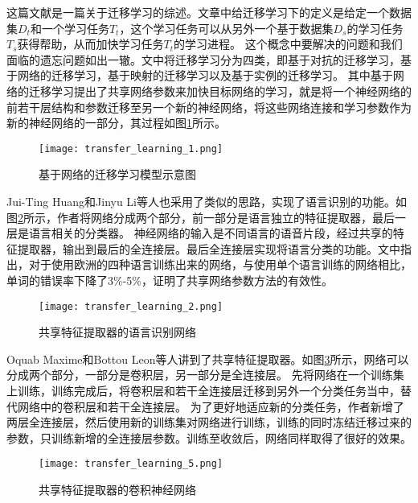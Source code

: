 这篇文献\cite{10.1007/978-3-030-01424-7_27}是一篇关于迁移学习的综述。文章中给迁移学习下的定义是给定一个数据集$D_t$和一个学习任务$T_t$，这个学习任务可以从另外一个基于数据集$D_s$的学习任务$T_s$获得帮助，从而加快学习任务$T_t$的学习进程。
这个概念中要解决的问题和我们面临的遗忘问题如出一辙。文中将迁移学习分为四类，即基于对抗的迁移学习，基于网络的迁移学习，基于映射的迁移学习以及基于实例的迁移学习。
其中基于网络的迁移学习提出了共享网络参数来加快目标网络的学习，就是将一个神经网络的前若干层结构和参数迁移至另一个新的神经网络，将这些网络连接和学习参数作为新的神经网络的一部分，其过程如图\ref{fig:transfer_learning_1}所示。
\begin{figure}
    \centering
    \texttt{[image: transfer\_learning\_1.png]}
    \caption{基于网络的迁移学习模型示意图\cite{10.1007/978-3-030-01424-7_27}}
    \label{fig:transfer_learning_1}
\end{figure}

Jui-Ting Huang和Jinyu Li等人\cite{6639081}也采用了类似的思路，实现了语言识别的功能。如图\ref{fig:transfer_learning_2}所示，作者将网络分成两个部分，前一部分是语言独立的特征提取器，最后一层是语言相关的分类器。
神经网络的输入是不同语言的语音片段，经过共享的特征提取器，输出到最后的全连接层。最后全连接层实现将语言分类的功能。文中指出，对于使用欧洲的四种语言训练出来的网络，与使用单个语言训练的网络相比，单词的错误率下降了3\%-5\%，证明了共享网络参数方法的有效性。
\begin{figure}
    \centering
    \texttt{[image: transfer\_learning\_2.png]}
    \caption{共享特征提取器的语言识别网络\cite{6639081}}
    \label{fig:transfer_learning_2}
\end{figure}

Oquab Maxime和Bottou Leon等人\cite{Oquab_2014_CVPR}讲到了共享特征提取器。如图\ref{fig:transfer_learning_5}所示，网络可以分成两个部分，一部分是卷积层，另一部分是全连接层。
先将网络在一个训练集上训练，训练完成后，将卷积层和若干全连接层迁移到另外一个分类任务当中，替代网络中的卷积层和若干全连接层。
为了更好地适应新的分类任务，作者新增了两层全连接层，然后使用新的训练集对网络进行训练，训练的同时冻结迁移过来的参数，只训练新增的全连接层参数。训练至收敛后，网络同样取得了很好的效果。 
\begin{figure}
    \centering
    \texttt{[image: transfer\_learning\_5.png]}
    \caption{共享特征提取器的卷积神经网络\cite{Oquab_2014_CVPR}}
    \label{fig:transfer_learning_5}
\end{figure}

